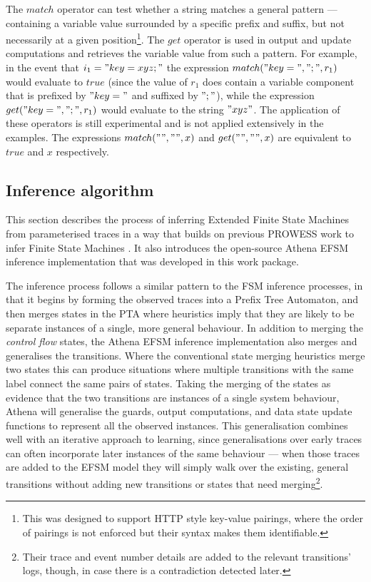 The $match$ operator can test whether a string matches a general pattern --- containing a variable value surrounded by a specific prefix and suffix, but not necessarily at a given position\footnote{This was designed to support HTTP style key-value pairings, where the order of pairings is not enforced but their syntax makes them identifiable.}. The $get$ operator is used in output and update computations and retrieves the variable value from such a pattern. For example, in the event that $i_1 = "key=xyz;"$ the expression $match("key=",";",r_1)$ would evaluate to $true$ (since the value of $r_1$ does contain a variable component that is prefixed by $"key="$ and suffixed by $";"$), while the expression $get("key=",";",r_1)$ would evaluate to the string $"xyz"$. The application of these operators is still experimental and is not applied extensively in the examples. The expressions $match("","",x)$ and $get("","",x)$ are equivalent to $true$ and $x$ respectively.

\subsection{Inference algorithm}
\label{Algorithm}

This section describes the process of inferring Extended Finite State Machines from parameterised traces in a way that builds on previous PROWESS work to infer Finite State Machines \cite{}. It also introduces the open-source Athena \cite{Athena} EFSM inference implementation that was developed in this work package.

The inference process follows a similar pattern to the FSM inference processes, in that it begins by forming the observed traces into a Prefix Tree Automaton, and then merges states in the PTA where heuristics imply that they are likely to be separate instances of a single, more general behaviour. In addition to merging the \emph{control flow} states, the Athena EFSM inference implementation also merges and generalises the transitions. Where the conventional state merging heuristics merge two states this can produce situations where multiple transitions with the same label connect the same pairs of states. Taking the merging of the states as evidence that the two transitions are instances of a single system behaviour, Athena will generalise the guards, output computations, and data state update functions to represent all the observed instances. This generalisation combines well with an iterative approach to learning, since generalisations over early traces can often incorporate later instances of the same behaviour --- when those traces are added to the EFSM model they will simply walk over the existing, general transitions without adding new transitions or states that need merging\footnote{Their trace and event number details are added to the relevant transitions' logs, though, in case there is a contradiction detected later.}.

